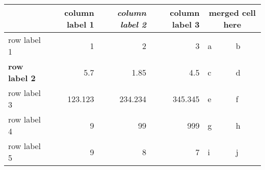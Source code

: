 \begin{tabular}{lrrrll} 
\toprule 
  	 & 	 column label 1 	 & 	 \textit{column label 2} 	 & 	 column label 3 	 & 	 \multicolumn{2}{c}{merged cell here} \\ 
\midrule 
row label 1 	 & 	 1 	 & 	 2 	 & 	 3 	 & 	 a 	 & 	 b \\ 
\textbf{row label 2} 	 & 	 5.7 	 & 	 1.85 	 & 	 4.5 	 & 	 c 	 & 	 d \\ 
row label 3 	 & 	 123.123 	 & 	 234.234 	 & 	 345.345 	 & 	 e 	 & 	 f \\ 
\cmidrule(r)\cmidrule(r){3-4} 	  
row label 4 	 & 	 9 	 & 	 99 	 & 	 999 	 & 	 g 	 & 	 h \\ 
row label 5 	 & 	 9 	 & 	 8 	 & 	 7 	 & 	 i 	 & 	 j \\ 
\bottomrule 
\end{tabular}